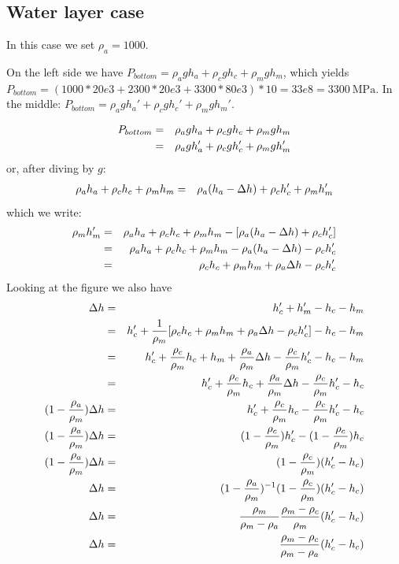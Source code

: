 \subsection*{Water layer case}

In this case we set $\rho_a=1000$.

On the left side we have $P_{bottom}=\rho_a g h_a + \rho_c g h_c + \rho_m g h_m$, which 
yields $P_{bottom}=(1000*20e3 + 2300*20e3 + 3300*80e3)*10 = 33e8=3300~\si{\mega\pascal}$.
In the middle:
$P_{bottom}=\rho_a g h_a' + \rho_c g h_c' + \rho_m g h_m'$.

\begin{eqnarray}
P_{bottom}
&=&\rho_a g h_a + \rho_c g h_c + \rho_m g h_m \nonumber\\
&=& \rho_a g h_a' + \rho_c g h_c' + \rho_m g h_m' \nonumber
\end{eqnarray}
or, after diving by $g$:
\begin{eqnarray}
\rho_a  h_a + \rho_c  h_c + \rho_m  h_m
&=& \rho_a  (h_a-\Delta h) + \rho_c  h_c' + \rho_m  h_m' \nonumber 
\end{eqnarray}
which we write:
\begin{eqnarray}
\rho_m  h_m' 
&=&  \rho_a  h_a + \rho_c  h_c + \rho_m  h_m - [\rho_a  (h_a-\Delta h) + \rho_c  h_c'] \nonumber\\
&=&  \rho_a  h_a + \rho_c  h_c + \rho_m  h_m - \rho_a  (h_a-\Delta h) - \rho_c  h_c' \nonumber\\
&=&  \rho_c  h_c + \rho_m  h_m + \rho_a  \Delta h - \rho_c  h_c' 
\end{eqnarray}
Looking at the figure we also have 
\begin{eqnarray}
\Delta h 
&=& h_c' + h_m' - h_c - h_m \nonumber\\
&=& h_c' + \frac{1}{\rho_m}[\rho_c  h_c + \rho_m  h_m + \rho_a  \Delta h - \rho_c  h_c'] - h_c - h_m \nonumber\\
&=& h_c' + \frac{\rho_c}{\rho_m} h_c +  h_m + \frac{\rho_a}{\rho_m} \Delta h - \frac{\rho_c}{\rho_m} h_c' - h_c - h_m \nonumber\\
&=& h_c' + \frac{\rho_c}{\rho_m} h_c + \frac{\rho_a}{\rho_m} \Delta h - \frac{\rho_c}{\rho_m} h_c' - h_c \nonumber\\
(1 - \frac{\rho_a}{\rho_m})\Delta h &=& h_c' + \frac{\rho_c}{\rho_m} h_c - \frac{\rho_c}{\rho_m} h_c' - h_c \nonumber\\
(1 - \frac{\rho_a}{\rho_m})\Delta h &=& (1 - \frac{\rho_c}{\rho_m})h_c' -(1 - \frac{\rho_c}{\rho_m}) h_c \nonumber\\
(1 - \frac{\rho_a}{\rho_m})\Delta h &=& (1 - \frac{\rho_c}{\rho_m})(h_c' - h_c) \nonumber\\
\Delta h &=&(1 - \frac{\rho_a}{\rho_m})^{-1}  (1 - \frac{\rho_c}{\rho_m})(h_c' - h_c) \nonumber\\
\Delta h &=& \frac{\rho_m}{\rho_m-\rho_a}  \frac{\rho_m-\rho_c}{\rho_m} (h_c' - h_c) \nonumber\\
\Delta h &=&  \frac{\rho_m-\rho_c}{\rho_m-\rho_a} (h_c' - h_c) 
\end{eqnarray}

